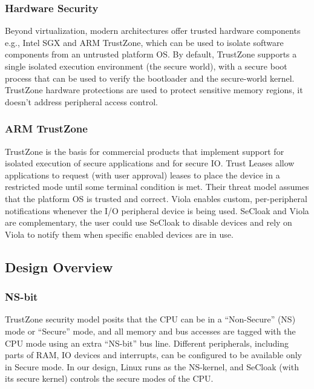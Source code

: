 \documentclass{article}
\begin{document}
\subsubsection{Hardware Security}

Beyond virtualization, modern architectures offer trusted hardware components e.g., Intel SGX and ARM TrustZone, which can be used to isolate software components from an untrusted platform OS. By default, TrustZone supports a single isolated execution environment (the secure world), with a secure boot process that can be used to verify the bootloader and the secure-world kernel. TrustZone hardware protections are used to protect sensitive memory regions, it doesn't address peripheral access control.

\subsubsection{ARM TrustZone}

TrustZone is the basis for commercial products that implement support for isolated execution of secure applications and for secure IO. Trust Leases allow applications to request (with user approval) leases to place the device in a restricted mode until some terminal condition is met. Their threat model assumes that the platform OS is trusted and correct. Viola enables custom, per-peripheral notifications whenever the I/O peripheral device is being used. SeCloak and Viola are complementary, the user could use SeCloak to disable devices and rely on Viola to notify them when specific enabled devices are in use.

\subsection{Design Overview}

\subsubsection{NS-bit}

TrustZone security model posits that the CPU can be in a “Non-Secure” (NS) mode or “Secure” mode, and all memory and bus accesses are tagged with the CPU mode using an extra “NS-bit” bus line. Different peripherals, including parts of RAM, IO devices and interrupts, can be configured to be available only in Secure mode. In our design, Linux runs as the NS-kernel, and SeCloak (with its secure kernel) controls the secure modes of the CPU. 
\end{document}
